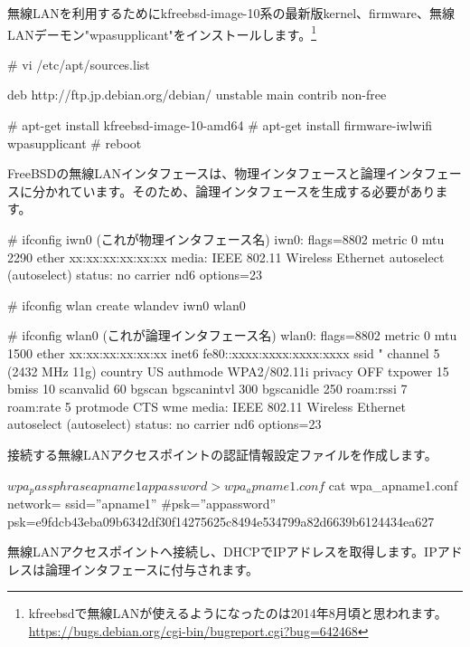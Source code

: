 \documentclass[mingoth,a4paper]{jsarticle}
\begin{document}
無線LANを利用するためにkfreebsd-image-10系の最新版kernel、firmware、無線LANデーモン"wpasupplicant"をインストールします。\footnote{kfreebsdで無線LANが使えるようになったのは2014年8月頃と思われます。 \url{https://bugs.debian.org/cgi-bin/bugreport.cgi?bug=642468}}

\begin{commandline}
  # vi /etc/apt/sources.list

  deb http://ftp.jp.debian.org/debian/ unstable main contrib non-free

  # apt-get install kfreebsd-image-10-amd64
  # apt-get install firmware-iwlwifi wpasupplicant
  # reboot
\end{commandline}

FreeBSDの無線LANインタフェースは、物理インタフェースと論理インタフェースに分かれています。そのため、論理インタフェースを生成する必要があります。

\begin{commandline}
  # ifconfig iwn0  (これが物理インタフェース名)
  iwn0: flags=8802 metric 0 mtu 2290
  ether xx:xx:xx:xx:xx:xx
  media: IEEE 802.11 Wireless Ethernet autoselect (autoselect)
  status: no carrier
  nd6 options=23

  # ifconfig wlan create wlandev iwn0
  wlan0

  # ifconfig wlan0 (これが論理インタフェース名)
  wlan0: flags=8802 metric 0 mtu 1500
  ether xx:xx:xx:xx:xx:xx
  inet6 fe80::xxxx:xxxx:xxxx:xxxx%
  ssid " channel 5 (2432 MHz 11g)
  country US authmode WPA2/802.11i privacy OFF txpower 15 bmiss 10
  scanvalid 60 bgscan bgscanintvl 300 bgscanidle 250 roam:rssi 7
  roam:rate 5 protmode CTS wme
  media: IEEE 802.11 Wireless Ethernet autoselect (autoselect)
  status: no carrier
      nd6 options=23
\end{commandline}

接続する無線LANアクセスポイントの認証情報設定ファイルを作成します。

\begin{commandline}
  $ wpa_passphrase apname1 appassword > wpa_apname1.conf
  $ cat wpa_apname1.conf
  network={
    ssid=''apname1''
    #psk=''appassword''
    psk=e9fdcb43eba09b6342df30f14275625c8494e534799a82d6639b6124434ea627
  }  
\end{commandline}

無線LANアクセスポイントへ接続し、DHCPでIPアドレスを取得します。IPアドレスは論理インタフェースに付与されます。
\end{document}
